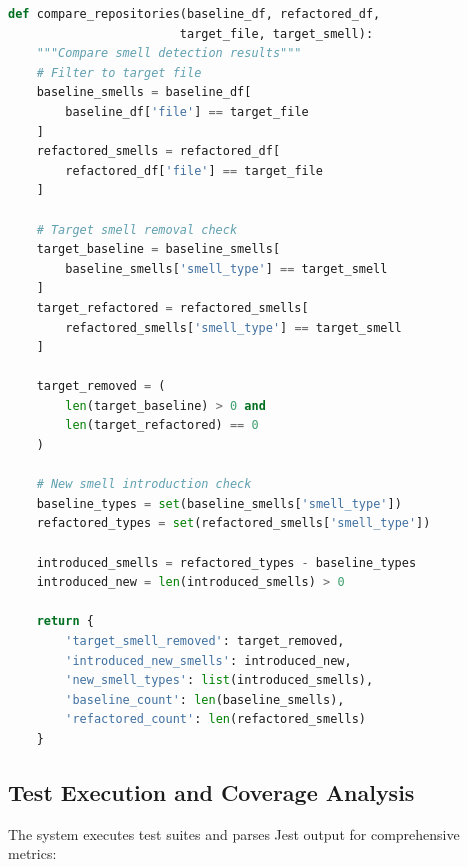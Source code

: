 \begin{lstlisting}[language=Python, caption=Smell Analysis]
def compare_repositories(baseline_df, refactored_df, 
                        target_file, target_smell):
    """Compare smell detection results"""
    # Filter to target file
    baseline_smells = baseline_df[
        baseline_df['file'] == target_file
    ]
    refactored_smells = refactored_df[
        refactored_df['file'] == target_file
    ]
    
    # Target smell removal check
    target_baseline = baseline_smells[
        baseline_smells['smell_type'] == target_smell
    ]
    target_refactored = refactored_smells[
        refactored_smells['smell_type'] == target_smell
    ]
    
    target_removed = (
        len(target_baseline) > 0 and 
        len(target_refactored) == 0
    )
    
    # New smell introduction check
    baseline_types = set(baseline_smells['smell_type'])
    refactored_types = set(refactored_smells['smell_type'])
    
    introduced_smells = refactored_types - baseline_types
    introduced_new = len(introduced_smells) > 0
    
    return {
        'target_smell_removed': target_removed,
        'introduced_new_smells': introduced_new,
        'new_smell_types': list(introduced_smells),
        'baseline_count': len(baseline_smells),
        'refactored_count': len(refactored_smells)
    }
\end{lstlisting}

\subsection{Test Execution and Coverage Analysis}

The system executes test suites and parses Jest output for comprehensive metrics:

